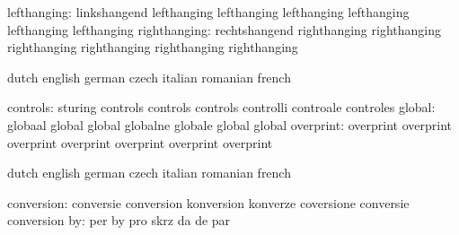               lefthanging: linkshangend              lefthanging
                           lefthanging               lefthanging
                           lefthanging               lefthanging
                           lefthanging
             righthanging: rechtshangend              righthanging
                           righthanging               righthanging
                           righthanging               righthanging
                           righthanging

\stopvariables

\startconstants            dutch                     english
                           german                    czech
                           italian                   romanian
                           french

                 controls: sturing                   controls
                           controls                  controls
                           controlli                 controale
                           controles
                   global: globaal                   global
                           global                    globalne
                           globale                   global
                           global
                overprint: overprint                 overprint
                           overprint                 overprint
                           overprint                 overprint
                           overprint

\stopconstants





\startvariables            dutch                     english
                           german                    czech
                           italian                   romanian
                           french

               conversion: conversie                 conversion
                           konversion                konverze
                           coversione                conversie
                           conversion
                       by: per                       by
                           pro                       skrz
                           da                        de
                           par

